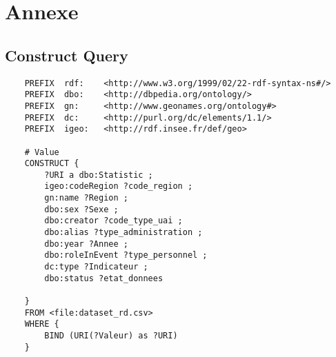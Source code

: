 \chapter{Annexe}
\section{Construct Query}

\begin{lstlisting}
	PREFIX  rdf:    <http://www.w3.org/1999/02/22-rdf-syntax-ns#/>
	PREFIX  dbo:    <http://dbpedia.org/ontology/>
	PREFIX  gn:     <http://www.geonames.org/ontology#>
	PREFIX  dc:     <http://purl.org/dc/elements/1.1/>
	PREFIX  igeo:   <http://rdf.insee.fr/def/geo>

	# Value
	CONSTRUCT {
		?URI a dbo:Statistic ;
		igeo:codeRegion ?code_region ;
		gn:name ?Region ;
		dbo:sex ?Sexe ;
		dbo:creator ?code_type_uai ;
		dbo:alias ?type_administration ;
		dbo:year ?Annee ;
		dbo:roleInEvent ?type_personnel ;
		dc:type ?Indicateur ;
		dbo:status ?etat_donnees

	}
	FROM <file:dataset_rd.csv>
	WHERE {
		BIND (URI(?Valeur) as ?URI)
	}
\end{lstlisting}